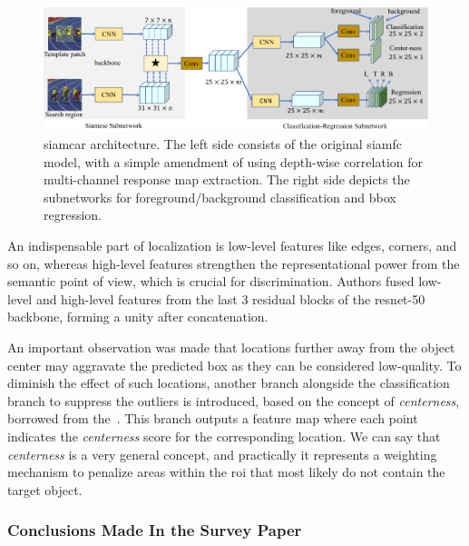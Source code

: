 \begin{figure}[t]
    \centerline{\includegraphics[width=\linewidth]{figures/theoretical_foundations/siamcar_architecture.pdf}}
    \caption[\gls{siamcar} architecture]{\gls{siamcar} architecture. The left side consists of the original \gls{siamfc}~\cite{bertinetto2016siamfc} model, with a simple amendment of using depth-wise correlation for multi-channel response map extraction. The right side depicts the subnetworks for foreground/background classification and \gls{bbox} regression. }
    \label{fig:SiamCARArchitecture}
\end{figure}

An indispensable part of localization is low-level features like edges, corners, and so on, whereas high-level features strengthen the representational power from the semantic point of view, which is crucial for discrimination. Authors fused low-level and high-level features from the last $3$ residual blocks of the \gls{resnet}-50 backbone, forming a unity after concatenation.

An important observation was made that locations further away from the object center may aggravate the predicted box as they can be considered low-quality. To diminish the effect of such locations, another branch alongside the classification branch to suppress the outliers is introduced, based on the concept of \emph{centerness}, borrowed from the~\cite{tian2019fcos}. This branch outputs a feature map where each point indicates the \emph{centerness} score for the corresponding location. We can say that \emph{centerness} is a very general concept, and practically it represents a weighting mechanism to penalize areas within the \gls{roi} that most likely do not contain the target object.

\subsubsection{Conclusions Made In the Survey Paper}

